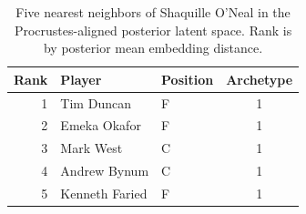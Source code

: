 \begin{table}[htbp]
  \centering\small
  \begin{tabular}{rllc}
    \toprule
    Rank & Player & Position & Archetype \\
    \midrule
    1 & Tim Duncan & F & 1 \\
    2 & Emeka Okafor & F & 1 \\
    3 & Mark West & C & 1 \\
    4 & Andrew Bynum & C & 1 \\
    5 & Kenneth Faried & F & 1 \\
    \bottomrule
  \end{tabular}
  \caption{Five nearest neighbors of Shaquille O'Neal in the Procrustes-aligned posterior latent space. Rank is by posterior mean embedding distance.}
  \label{tab:Shaquille_O_Neal_neighbors}
\end{table}

